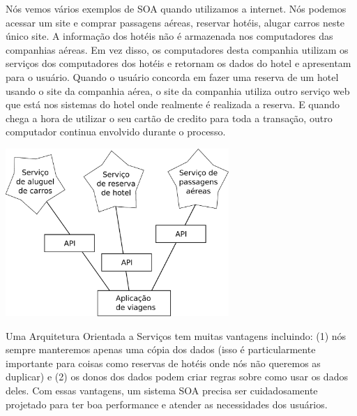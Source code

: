 Nós vemos vários exemplos de SOA quando utilizamos a internet. Nós podemos
acessar um site e comprar passagens aéreas, reservar hotéis, alugar carros
neste único site. A informação dos hotéis não é armazenada nos computadores
das companhias aéreas. Em vez disso, os computadores desta companhia utilizam
os serviços dos computadores dos hotéis e retornam os dados do hotel e
apresentam para o usuário. Quando o usuário concorda em fazer uma reserva de
um hotel usando o site da companhia aérea, o site da companhia utiliza outro 
serviço web que está nos sistemas do hotel onde realmente é realizada a reserva.
E quando chega a hora de utilizar o seu cartão de credito para toda a transação,
outro computador continua envolvido durante o processo.

\beforefig
\centerline{\includegraphics[height=2.50in]{figs2/soa.eps}}
\afterfig
Uma Arquitetura Orientada a Serviços tem muitas vantagens incluindo: (1)
nós sempre manteremos apenas uma cópia dos dados (isso é particularmente
importante para coisas como reservas de hotéis onde nós não queremos as duplicar)
e (2) os donos dos dados podem criar regras sobre como usar os dados deles.
Com essas vantagens, um sistema SOA precisa ser cuidadosamente projetado
para ter boa performance e atender as necessidades dos usuários.

